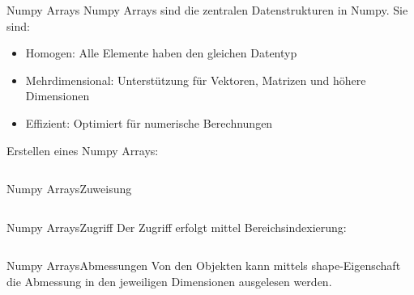 \documentclass[xelatex,aspectratio=169]{beamer}
\begin{document}
\begin{frame}{Numpy Arrays}
    Numpy Arrays sind die zentralen Datenstrukturen in Numpy. Sie sind:
    \begin{itemize}
        \item Homogen: Alle Elemente haben den gleichen Datentyp
        \item Mehrdimensional: Unterstützung für Vektoren, Matrizen und höhere Dimensionen
        \item Effizient: Optimiert für numerische Berechnungen
    \end{itemize}
    Erstellen eines Numpy Arrays:
    \inputminted{python}{src/numpy_arrays.py}
\end{frame}

\begin{frame}{Numpy Arrays}{Zuweisung}
    \inputminted[lastline=12]{python}{src/numpy_arrays_example.py}
\end{frame}
\begin{frame}{Numpy Arrays}{Zugriff}
    Der Zugriff erfolgt mittel Bereichsindexierung:

    \inputminted[firstline=14, lastline=24]{python}{src/numpy_arrays_example.py}
\end{frame}
\begin{frame}{Numpy Arrays}{Abmessungen}
    Von den Objekten kann mittels shape-Eigenschaft die Abmessung in den jeweiligen Dimensionen ausgelesen werden.
    \inputminted[firstline=26, lastline=29]{python}{src/numpy_arrays_example.py}
\end{frame}
\end{document}
